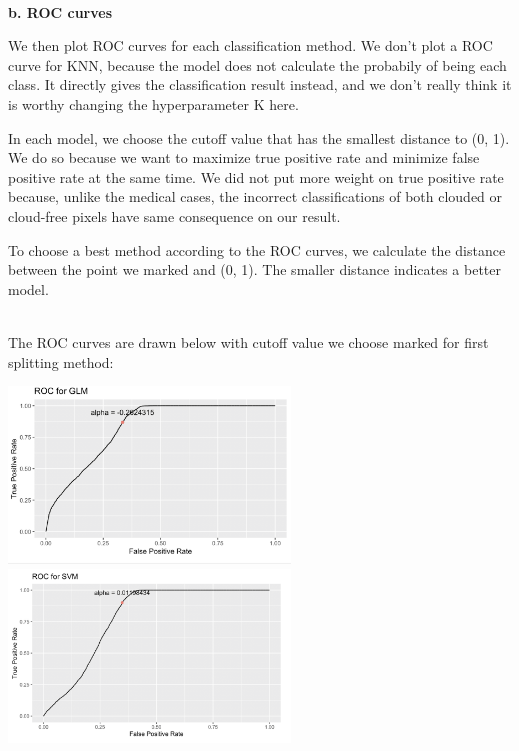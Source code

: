 \documentclass[11pt]{article}
\begin{document}
\vspace{0.3cm}
\mbox{}\\
\textbf{b. ROC curves}

We then plot ROC curves for each classification method. We don't plot a ROC curve for KNN, because the model does not calculate the probabily of being each class. It directly gives the classification result instead, and we don't really think it is worthy changing the hyperparameter K here. 

In each model, we choose the cutoff value that has the smallest distance to (0, 1). We do so because we want to maximize true positive rate and minimize false positive rate at the same time. We did not put more weight on true positive rate because, unlike the medical cases, the incorrect classifications of both clouded or cloud-free pixels have same consequence on our result.

To choose a best method according to the ROC curves, we calculate the distance between the point we marked and (0, 1). The smaller distance indicates a better model.

\mbox{}\\
The ROC curves are drawn below with cutoff value we choose marked for first splitting method:

\includegraphics[width = 7.5cm]{3(b)1-1}
\includegraphics[width = 7.5cm]{3(b)1-2}
\end{document}
